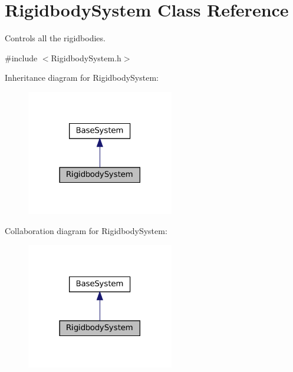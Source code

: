 \hypertarget{classRigidbodySystem}{}\section{Rigidbody\+System Class Reference}
\label{classRigidbodySystem}


Controls all the rigidbodies.  




{\ttfamily \#include $<$Rigidbody\+System.\+h$>$}



Inheritance diagram for Rigidbody\+System\+:
\nopagebreak
\begin{figure}[H]
\begin{center}
\leavevmode
\includegraphics[width=182pt]{classRigidbodySystem__inherit__graph}
\end{center}
\end{figure}


Collaboration diagram for Rigidbody\+System\+:
\nopagebreak
\begin{figure}[H]
\begin{center}
\leavevmode
\includegraphics[width=182pt]{classRigidbodySystem__coll__graph}
\end{center}
\end{figure}

